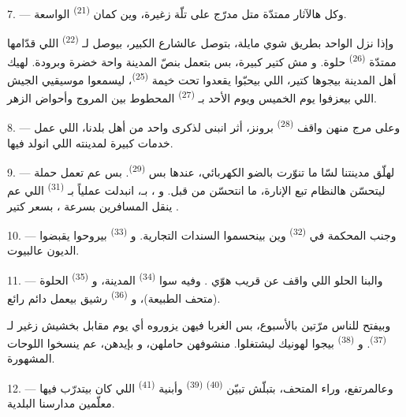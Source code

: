 7. --- وكل هالآثار ممتدّة متل مدرّج على تلّة زغيرة، وين كمان
 \textsuperscript{(21)} الواسعة.

وإذا نزل الواحد بطريق شوي مايلة، بتوصل عالشارع الكبير، بيوصل
لـ \textsuperscript{(22)} اللي قدّامها ممتدّة
 \textsuperscript{(26)} حلوة. و
مش كتير كبيرة، بس بتعمل بنصّ المدينة واحة خضرة وبرودة. لهيك أهل
المدينة بيجوها كتير، اللي بيحبّوا يقعدوا تحت خيمة 
\textsuperscript{(25)}، ليسمعوا موسيقيي الجيش اللي بيعزفوا يوم الخميس
ويوم الأحد بـ \textsuperscript{(27)} المحطوط بين
المروج وأحواض الزهر.

8. --- وعلى مرج منهن واقف  \textsuperscript{(28)} برونز،
أثر انبنى لذكرى واحد من أهل بلدنا، اللي عمل خدمات كبيرة لمدينته اللي
انولد فيها.

\VUsaut{4.0mm}
\VUsaut{3.4mm}

9. --- لهلّق مدينتنا لسّا ما تنوّرت بالضو الكهربائي، عندها بس
 \textsuperscript{(29)}. بس  عم
تعمل حملة ليتحسّن هالنظام تبع الإنارة،  ما
 انتحسّن من قبل. و
،  بـ، انبدلت عملياً
بـ \textsuperscript{(31)} اللي عم ينقل
المسافرين بسرعة ، بسعر كتير
.

10. --- وجنب المحكمة في  \textsuperscript{(32)} وين
بينحسموا السندات التجارية. و \textsuperscript{(33)}
بيروحوا يقبضوا الديون عالبيوت.

\VUsaut{4.0mm}
\VUsaut{3.4mm}

11. --- والبنا الحلو اللي واقف عن قريب هوّي . وفيه
سوا  \textsuperscript{(34)} المدينة، و \textsuperscript{(35)} الحلوة (متحف الطبيعة)،
و \textsuperscript{(36)} رشيق بيعمل  دائم
رائع.

وبيفتح للناس مرّتين بالأسبوع، بس الغربا فيهن يزوروه أي يوم مقابل
بخشيش زغير لـ \textsuperscript{(37)}.
و \textsuperscript{(38)} بيجوا لهونيك ليشتغلوا.
منشوفهن  حاملهن، و بإيدهن، عم ينسخوا
اللوحات المشهورة.

12. --- وعالمرتفع، وراء المتحف، بتبلّش تبيّن 
\textsuperscript{(40)}  \textsuperscript{(39)} وأبنية
 \textsuperscript{(41)} اللي كان بيتدرّب فيها
معلّمين مدارسنا البلدية.

